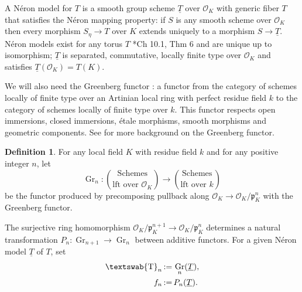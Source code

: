 \documentclass[11pt]{amsart}
\newcommand{\mathswab}[1]{\operatorname{\textswab{#1}}}
\theoremstyle{plain}
\theoremstyle{definition}
\newtheorem{definition}[theorem]{Definition}
\theoremstyle{remark}
\newcommand{\OK}{\mathcal{O}_K}
\newcommand{\pK}{\mathfrak{p}_K}
\newcommand{\Fq}{k}
\DeclareMathOperator{\Gr}{Gr}
\newcommand{\ceq}{{\, :=\, }}
\newcommand{\GN}[1]{\mathswab{#1}}
\newcommand{\TT}{\underline{T}}
\newcommand{\partop}[2]{\genfrac{(}{)}{0pt}{0}{#1}{#2}}
\begin{document}
A N\'eron model for $T$ is a smooth group scheme $\TT$ over $\OK$ with generic fiber $T$
that satisfies the N\'eron mapping property: if $S$ is any smooth scheme over $\OK$ then every morphism
$S_\eta \to T$ over $K$ extends uniquely to a morphism $S \to \TT$.  N\'eron models exist for any torus
$T$ \cite{bosch-lutkebohmert-reynaud:NeronModels}*{Ch 10.1, Thm 6} and are unique up to isomorphism;
$\TT$ is separated, commutative, locally finite type over $\OK$ and satisfies $\TT(\OK) = T(K)$.

We will also need the Greenberg functor :
a functor from the category of schemes locally of finite type 
over an Artinian local ring with perfect residue field $k$ 
to the category of schemes locally of finite type over $k$. 
This functor respects open immersions, closed immersions, \'etale morphisms, smooth morphisms and geometric components.
See
for more background on the Greenberg functor. 

\begin{definition}\label{def:Grn}
For any local field $K$ with residue field $\Fq$ and for any positive integer $n$, let
\[
\Gr_n : \partop{\text{Schemes}}{\text{lft over $\OK$}} \to \partop{\text{Schemes}}{\text{lft over $\Fq$}}
\]
be the functor produced by precomposing pullback along $\OK \to \OK/\pK^n$ with the Greenberg functor.
\end{definition}

The surjective ring homomorphism $\OK/\pK^{n+1} \to \OK/\pK^n$ determines a
natural transformation $P_{n} : \Gr_{n+1} \to \Gr_n$ between additive functors.
For a given Néron model $\TT$ of $T$, set
\begin{align*}
 \GN{T}_n &\ceq \Gr_n(\TT), \\
 f_n &\ceq P_n(\TT).
\end{align*}
\end{document}
